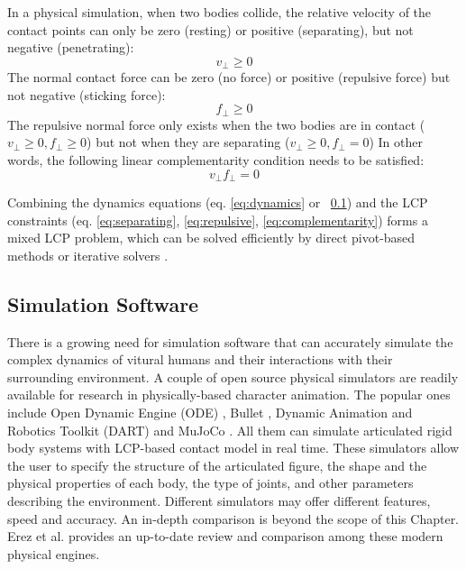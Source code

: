 In a physical simulation, when two bodies collide, the relative velocity of the contact points can only be zero (resting) or positive (separating), but not negative (penetrating):
\begin{equation}
v_\perp\geq 0
\label{eq:separating}
\end{equation}
The normal contact force can be zero (no force) or positive (repulsive force) but not negative (sticking force):
\begin{equation}
f_\perp \geq 0
\label{eq:repulsive}
\end{equation}
The repulsive normal force only exists when the two bodies are in contact ($v_\perp\geq 0, f_\perp\geq 0$)
but not when they are separating ($v_\perp \geq 0, f_\perp =0$)
In other words, the following linear complementarity condition needs to be satisfied:
\begin{equation}
v_\perp f_\perp =0
\label{eq:complementarity}
\end{equation}

Combining the dynamics equations (eq. \ref{eq:dynamics} or ~\ref{}) and the LCP constraints (eq. \ref{eq:separating}, \ref{eq:repulsive}, \ref{eq:complementarity}) forms a mixed LCP problem, which can be solved efficiently by direct pivot-based methods \cite{} or iterative solvers \cite{}. 


\subsection{Simulation Software}

There is a growing need for simulation software that can accurately simulate the complex dynamics of vitural humans and their interactions with their surrounding environment. A couple of open source physical simulators are readily available for research in physically-based character animation. The popular ones include Open Dynamic Engine (ODE) \cite{}, Bullet \cite{}, Dynamic Animation and Robotics Toolkit (DART) \cite{} and MuJoCo \cite{}. All them can simulate articulated rigid body systems with LCP-based contact model in real time. These simulators allow the user to specify the structure of the articulated figure, the shape and the physical properties of each body, the type of joints, and other parameters describing the environment. Different simulators may offer different features, speed and accuracy. An in-depth comparison is beyond the scope of this Chapter. Erez et al.\cite{} provides an up-to-date review and comparison among these modern physical engines.
